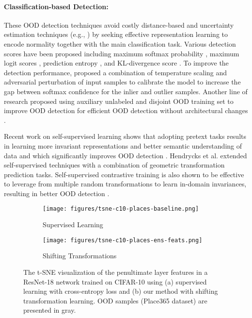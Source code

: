 \documentclass[letterpaper]{article} \usepackage{aaai22}  \usepackage{times}  \usepackage{helvet}  \usepackage{courier}  \usepackage[hyphens]{url}  \usepackage{graphicx} \urlstyle{rm} \def\UrlFont{\rm}  \usepackage{natbib}  \usepackage{caption} \DeclareCaptionStyle{ruled}{labelfont=normalfont,labelsep=colon,strut=off} \frenchspacing  \setlength{\pdfpagewidth}{8.5in}  \setlength{\pdfpageheight}{11in}
\begin{document}
\paragraph{Classification-based Detection:}
These OOD detection techniques avoid costly distance-based and uncertainty estimation techniques (e.g., \citet{gal2016dropout}) by seeking effective representation learning to encode normality together with the main classification task. 
Various detection scores have been proposed including maximum softmax probability \cite{hendrycks2016baseline}, maximum logit scores \cite{hendrycks2019benchmark}, prediction entropy \cite{mohseni2020ood}, and KL-divergence score \cite{Hendrycks2019sv}. 
To improve the detection performance, \cite{lee2017training,hsu2020generalized} proposed a combination of temperature scaling and adversarial perturbation of input samples to calibrate the model to increase the gap between softmax confidence for the inlier and outlier samples. 
Another line of research proposed using auxiliary unlabeled and disjoint OOD training set to improve OOD detection for efficient OOD detection without architectural changes \cite{hendrycks2018deep,mohseni2020ood}. 

Recent work on self-supervised learning shows that adopting pretext tasks results in learning more invariant representations and better semantic understanding of data \cite{dosovitskiy2014discriminative} and which significantly improves OOD detection \cite{golan2018deep}. 
Hendrycks et al. \cite{Hendrycks2019sv} extended self-supervised techniques with a combination of geometric transformation prediction tasks. 
Self-supervised contrastive training \cite{chen2020simple} is also shown to be effective to leverage from multiple random transformations to learn in-domain invariances, resulting in better OOD detection \cite{winkens2020contrastive,sehwag2021ssd,tack2020csi}.  





\begin{figure}[!t]
\begin{center}
    \begin{subfigure}[b]{0.49\columnwidth}
        \centerline{\texttt{[image: figures/tsne-c10-places-baseline.png]}}
        \captionsetup{justification=centering} \caption{Supervised Learning} \end{subfigure}
    \begin{subfigure}[b]{0.49\columnwidth}
        \centerline{\texttt{[image: figures/tsne-c10-places-ens-feats.png]}}
        \captionsetup{justification=centering}
        \caption{Shifting Transformations}
    \end{subfigure}
\caption{The t-SNE visualization of the penultimate layer features in a ResNet-18 network trained on CIFAR-10 using (a) supervised learning with cross-entropy loss and (b) our method with shifting transformation learning. OOD samples (Place365 dataset) are presented in gray.} \label{fig:tsne}
\end{center}
\vskip -0.2in
\end{figure}
\end{document}
